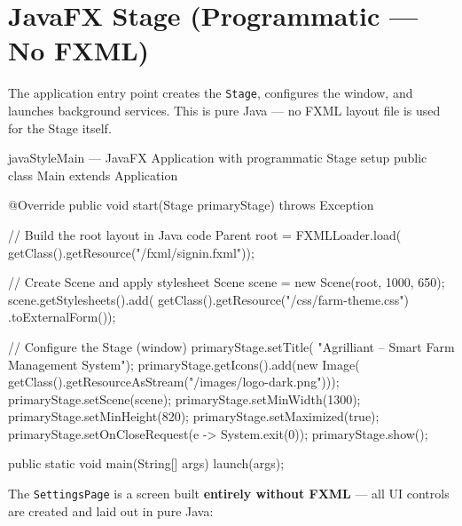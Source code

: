 \documentclass[12pt, a4paper]{report}
\begin{document}
\section{JavaFX Stage (Programmatic --- No FXML)}

The application entry point creates the \texttt{Stage}, configures the window, and launches background services. This is pure Java --- no FXML layout file is used for the Stage itself.

\begin{codeblock}{javaStyle}{Main --- JavaFX Application with programmatic Stage setup}
public class Main extends Application {

    @Override
    public void start(Stage primaryStage) throws Exception {
        // Build the root layout in Java code
        Parent root = FXMLLoader.load(
            getClass().getResource("/fxml/signin.fxml"));

        // Create Scene and apply stylesheet
        Scene scene = new Scene(root, 1000, 650);
        scene.getStylesheets().add(
            getClass().getResource("/css/farm-theme.css")
                      .toExternalForm());

        // Configure the Stage (window)
        primaryStage.setTitle(
            "Agrilliant -- Smart Farm Management System");
        primaryStage.getIcons().add(new Image(
            getClass().getResourceAsStream("/images/logo-dark.png")));
        primaryStage.setScene(scene);
        primaryStage.setMinWidth(1300);
        primaryStage.setMinHeight(820);
        primaryStage.setMaximized(true);
        primaryStage.setOnCloseRequest(e -> System.exit(0));
        primaryStage.show();
    }

    public static void main(String[] args) {
        launch(args);
    }
}
\end{codeblock}

The \texttt{SettingsPage} is a screen built \textbf{entirely without FXML} --- all UI controls are created and laid out in pure Java:
\end{document}

